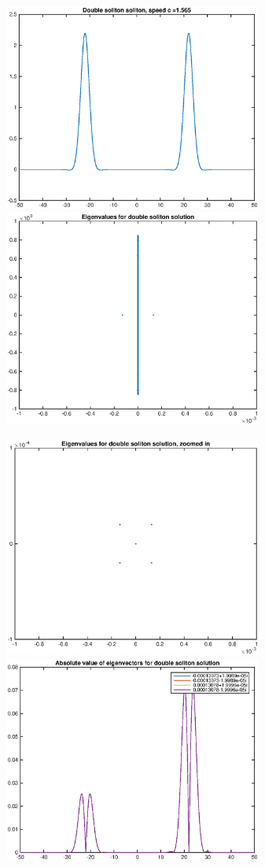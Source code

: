 \documentclass[12pt]{article}
\begin{document}
\begin{enumerate}
\begin{figure}[H]
\includegraphics[width=8.5cm]{double4.eps}
\includegraphics[width=8.5cm]{double4eig.eps}
\end{figure}

\begin{figure}[H]
\includegraphics[width=8.5cm]{double4eigzoom.eps}
\includegraphics[width=8.5cm]{double4vecabs.eps}
\end{figure}


\end{enumerate}
\end{document}
